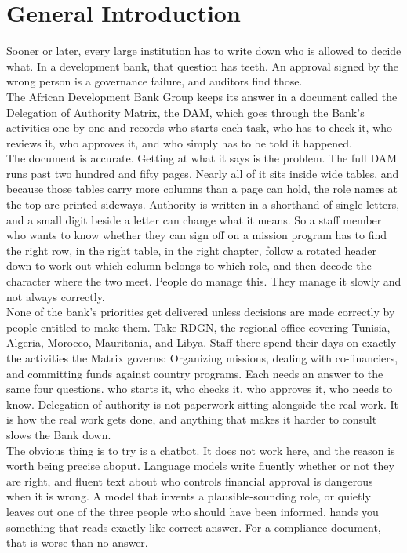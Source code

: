 \chapter*{General Introduction}

Sooner or later, every large institution has to write down who is allowed to decide what. In a development bank, that question has teeth. An approval signed by the wrong person is a governance failure, and auditors find those. \\[0.3cm]
The African Development Bank Group keeps its answer in a document called the Delegation of Authority Matrix, the DAM, which goes through the Bank's activities one by one and records who starts each task, who has to check it, who reviews it, who approves it, and who simply has to be told it happened. \\[0.3cm]
The document is accurate. Getting at what it says is the problem. The full DAM runs past two hundred and fifty pages. Nearly all of it sits inside wide tables, and because those tables carry more columns than a page can hold, the role names at the top are printed sideways. Authority is written in a shorthand of single letters, and a small digit beside a letter can change what it means. So a staff member who wants to know whether they can sign off on a mission program has to find the right row, in the right table, in the right chapter, follow a rotated header down to work out which column belongs to which role, and then decode the character where the two meet. People do manage this. They manage it slowly and not always correctly. \\[0.3cm]
None of the bank's priorities get delivered unless decisions are made correctly by people entitled to make them. Take RDGN, the regional office covering Tunisia, Algeria, Morocco, Mauritania, and Libya. Staff there spend their days on exactly the activities the Matrix governs: Organizing missions, dealing with co-financiers, and committing funds against country programs. Each needs an answer to the same four questions. who starts it, who checks it, who approves it, who needs to know. Delegation of authority is not paperwork sitting alongside the real work. It is how the real work gets done, and anything that makes it harder to consult slows the Bank down. \\[0.3cm]
The obvious thing is to try is a chatbot. It does not work here, and the reason is worth being precise aboput. Language models write fluently whether or not they are right, and fluent text about who controls financial approval is dangerous when it is wrong. A model that invents a plausible-sounding role, or quietly leaves out one of the three people who should have been informed, hands you something that reads exactly like correct answer. For a compliance document, that is worse than no answer. \\[0.3cm]
